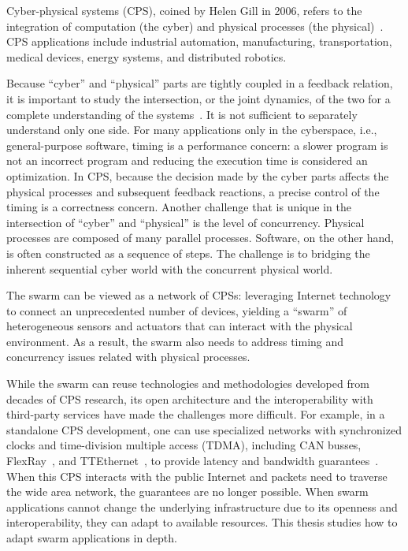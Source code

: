 Cyber-physical systems (CPS), coined by Helen Gill in 2006, refers to the
integration of computation (the cyber) and physical processes (the
physical)~\cite{lee2015past}. CPS applications include industrial automation,
manufacturing, transportation, medical devices, energy systems, and distributed
robotics.

Because ``cyber'' and ``physical'' parts are tightly coupled in a feedback
relation, it is important to study the intersection, or the joint dynamics, of
the two for a complete understanding of the systems~\cite{rajkumar2010cyber}. It
is not sufficient to separately understand only one side. For many applications
only in the cyberspace, i.e., general-purpose software, timing is a performance
concern: a slower program is not an incorrect program and reducing the execution
time is considered an optimization. In CPS, because the decision made by the
cyber parts affects the physical processes and subsequent feedback reactions, a
precise control of the timing is a correctness concern. Another challenge that
is unique in the intersection of ``cyber'' and ``physical'' is the level of
concurrency. Physical processes are composed of many parallel
processes. Software, on the other hand, is often constructed as a sequence of
steps. The challenge is to bridging the inherent sequential cyber world with the
concurrent physical world.

The swarm can be viewed as a network of CPSs: leveraging Internet technology to
connect an unprecedented number of devices, yielding a ``swarm'' of
heterogeneous sensors and actuators that can interact with the physical
environment. As a result, the swarm also needs to address timing and concurrency
issues related with physical processes.

While the swarm can reuse technologies and methodologies developed from decades
of CPS research, its open architecture and the interoperability with third-party
services have made the challenges more difficult. For example, in a standalone
CPS development, one can use specialized networks with synchronized clocks and
time-division multiple access (TDMA), including CAN busses,
FlexRay~\cite{flexray2005flexray}, and TTEthernet~\cite{steiner2008ttethernet},
to provide latency and bandwidth guarantees~\cite{lee2018real}. When this CPS
interacts with the public Internet and packets need to traverse the wide area
network, the guarantees are no longer possible. When swarm applications cannot
change the underlying infrastructure due to its openness and interoperability,
they can adapt to available resources. This thesis studies how to adapt swarm
applications in depth.

